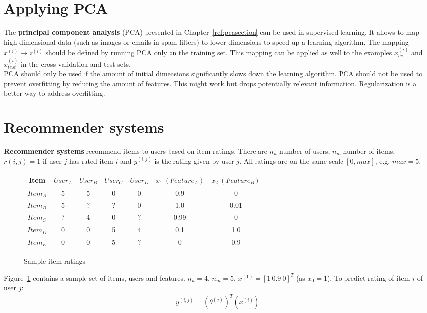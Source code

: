 \documentclass{report}
\begin{document}
\section{Applying PCA}
The {\bf principal component analysis} (PCA) presented in Chapter~\ref{ref:pcasection} can be used in supervised learning.
It allows to map high-dimensional data (such as images or emails in spam filters) to lower dimensions to speed up a learning algorithm.
The mapping $x^{(i)}\rightarrow z^{(i)}$ should be defined by running PCA only on the training set.
This mapping can be applied as well to the examples $x^{(i)}_{cv}$ and $x^{(i)}_{test}$ in the cross validation and test sets. \\

PCA should only be used if the amount of initial dimensions significantly slows down the learning algorithm. PCA should not be used to prevent overfitting by reducing the amount of features. This might work but drops potentially relevant information. Regularization is a better way to address overfitting.


\section{Recommender systems}
{\bf Recommender systems} recommend items to users based on item ratings. There are $n_u$ number of users, $n_m$ number of items, $r(i,j)=1$ if user $j$ has rated item $i$ and $y^{(i,j)}$ is the rating given by user $j$. All ratings are on the same scale $[0,max]$, e.g. $max=5$.

\begin{figure}[h!]
\centering
\begin{tabular}{c||cccc||cc}
Item & $User_A$ & $User_B$ & $User_C$ & $User_D$ & $x_1\:(Feature_A)$ & $x_2\:(Feature_B)$ \\
\hline
\hline
$Item_A$ & 5 & 5 & 0 & 0 & 0.9 & 0 \\
$Item_B$ & 5 & ? & ? & 0 & 1.0 & 0.01 \\
$Item_C$ & ? & 4 & 0 & ? & 0.99 & 0 \\
$Item_D$ & 0 & 0 & 5 & 4 & 0.1 &1.0 \\
$Item_E$ & 0 & 0 & 5 & ? & 0 & 0.9 \\
\end{tabular}
\caption{Sample item ratings}
\label{ref:sampleitemratings}
\end{figure}

Figure~\ref{ref:sampleitemratings} contains a sample set of items, users and features. $n_u=4$, $n_m=5$, $x^{(1)}= [1\:0.9\:0]^T$ (as $x_0=1$). To predict rating of item $i$ of user $j$:
\begin{align*}
y^{(i,j)}=(\theta^{(j)})^T(x^{(i)})
\end{align*}
\end{document}

